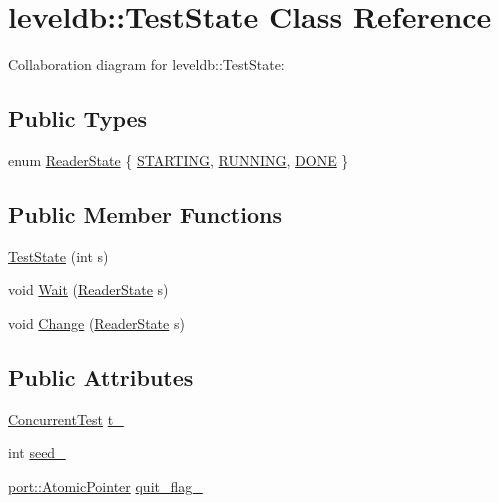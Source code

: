 \hypertarget{classleveldb_1_1_test_state}{\section{leveldb\-:\-:Test\-State Class Reference}
\label{classleveldb_1_1_test_state}
}


Collaboration diagram for leveldb\-:\-:Test\-State\-:
\subsection*{Public Types}
\begin{DoxyCompactItemize}
\item 
enum \hyperlink{classleveldb_1_1_test_state_a1bf1f0a16815237ff1f29d2925d9a4ad}{Reader\-State} \{ \hyperlink{classleveldb_1_1_test_state_a1bf1f0a16815237ff1f29d2925d9a4ada93ff507fceeb18ff487d343ce24e49fb}{S\-T\-A\-R\-T\-I\-N\-G}, 
\hyperlink{classleveldb_1_1_test_state_a1bf1f0a16815237ff1f29d2925d9a4adab21481f14b9bab70778076d33ea574da}{R\-U\-N\-N\-I\-N\-G}, 
\hyperlink{classleveldb_1_1_test_state_a1bf1f0a16815237ff1f29d2925d9a4ada5d7f032453f326a46f7ebd8b3f0c7d83}{D\-O\-N\-E}
 \}
\end{DoxyCompactItemize}
\subsection*{Public Member Functions}
\begin{DoxyCompactItemize}
\item 
\hyperlink{classleveldb_1_1_test_state_a777f2182bef5c524d580dc26ec589c2d}{Test\-State} (int s)
\item 
void \hyperlink{classleveldb_1_1_test_state_ab11f5574ad50202e18e8274e16953f0a}{Wait} (\hyperlink{classleveldb_1_1_test_state_a1bf1f0a16815237ff1f29d2925d9a4ad}{Reader\-State} s)
\item 
void \hyperlink{classleveldb_1_1_test_state_ae63a695f700220714efa0e622511740c}{Change} (\hyperlink{classleveldb_1_1_test_state_a1bf1f0a16815237ff1f29d2925d9a4ad}{Reader\-State} s)
\end{DoxyCompactItemize}
\subsection*{Public Attributes}
\begin{DoxyCompactItemize}
\item 
\hyperlink{classleveldb_1_1_concurrent_test}{Concurrent\-Test} \hyperlink{classleveldb_1_1_test_state_a090fd0c59fb141c4843511b4020f05e9}{t\-\_\-}
\item 
int \hyperlink{classleveldb_1_1_test_state_aa44f519b574945b0061c88df42fd4725}{seed\-\_\-}
\item 
\hyperlink{classleveldb_1_1port_1_1_atomic_pointer}{port\-::\-Atomic\-Pointer} \hyperlink{classleveldb_1_1_test_state_a04e07cf69866e925db3fafd5cf9fa23f}{quit\-\_\-flag\-\_\-}
\end{DoxyCompactItemize}
